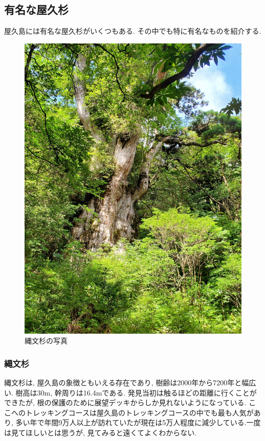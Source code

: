\documentclass[10pt,titlepage,a5paper]{ltjsbook}
\begin{document}
  \subsection{有名な屋久杉}
  屋久島には有名な屋久杉がいくつもある. その中でも特に有名なものを紹介する.
  \begin{minipage}{0.38\columnwidth}
    \begin{figure}[H]
      \centering
      \includegraphics[width=\columnwidth]{joumon.jpg}
      \caption{縄文杉の写真}
      \label{fig:jomon_photo}
    \end{figure}
  \end{minipage}
  \hfill
  \begin{minipage}{0.58\columnwidth}
    \subsubsection*{縄文杉}
      縄文杉は, 屋久島の象徴ともいえる存在であり, 樹齢は2000年から7200年と幅広い\footnotemark[7]. 樹高は30m, 幹周りは16.4mである. 発見当初は触るほどの距離に行くことができたが, 
      根の保護のために展望デッキからしか見れないようになっている. ここへのトレッキングコースは屋久島のトレッキングコースの中でも最も人気があり, 多い年で年間9万人以上が訪れていたが現在は5万人程度に減少している.一度は見てほしいとは思うが, 見てみると遠くてよくわからない.
  \end{minipage}
\end{document}

